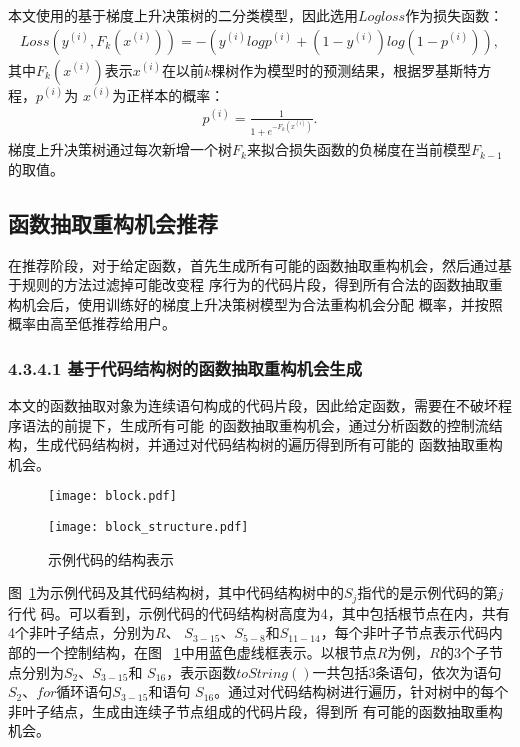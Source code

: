 本文使用的基于梯度上升决策树的二分类模型，因此选用$Logloss$作为损失函数：
\begin{eqnarray}
  Loss(y^{(i)},F_k(x^{(i)})) = -(y^{(i)}logp^{(i)} + (1-y^{(i)})log(1-p^{(i)})),
\end{eqnarray}\label{logloss}
其中$F_k(x^{(i)})$表示$x^{(i)}$在以前$k$棵树作为模型时的预测结果，根据罗基斯特方程，$p^{(i)}$为
$x^{(i)}$为正样本的概率：
\begin{eqnarray}
  p^{(i)} = \frac{1}{1 + e^{-F_k(x^{(i)})}}.
\end{eqnarray}
梯度上升决策树通过每次新增一个树$F_k$来拟合损失函数的负梯度在当前模型$F_{k-1}$的取值。

\subsection{函数抽取重构机会推荐}
在推荐阶段，对于给定函数，首先生成所有可能的函数抽取重构机会，然后通过基于规则的方法过滤掉可能改变程
序行为的代码片段，得到所有合法的函数抽取重构机会后，使用训练好的梯度上升决策树模型为合法重构机会分配
概率，并按照概率由高至低推荐给用户。

\subsubsection{4.3.4.1 基于代码结构树的函数抽取重构机会生成}
本文的函数抽取对象为连续语句构成的代码片段，因此给定函数，需要在不破坏程序语法的前提下，生成所有可能
的函数抽取重构机会，通过分析函数的控制流结构，生成代码结构树，并通过对代码结构树的遍历得到所有可能的
函数抽取重构机会。

\begin{figure} 
  \centering 
  \begin{minipage}[c]{0.5\textwidth} 
    \centering 
    \texttt{[image: block.pdf]} 
  \end{minipage}%
  \begin{minipage}[r]{0.5\textwidth} 
    \centering 
    \texttt{[image: block\_structure.pdf]} 
  \end{minipage} 
\caption{示例代码的结构表示}
\label{block-example}
\end{figure}

图~\ref{block-example}为示例代码及其代码结构树，其中代码结构树中的$S_j$指代的是示例代码的第$j$行代
码。可以看到，示例代码的代码结构树高度为4，其中包括根节点在内，共有4个非叶子结点，分别为$R$、
$S_{3-15}$、$S_{5-8}$和$S_{11-14}$，每个非叶子节点表示代码内部的一个控制结构，在图
~\ref{block-example}中用蓝色虚线框表示。以根节点$R$为例，$R$的3个子节点分别为$S_2$、$S_{3-15}$和
$S_{16}$，表示函数$toString()$一共包括3条语句，依次为语句$S_2$、$for$循环语句$S_{3-15}$和语句
$S_{16}$。通过对代码结构树进行遍历，针对树中的每个非叶子结点，生成由连续子节点组成的代码片段，得到所
有可能的函数抽取重构机会。

